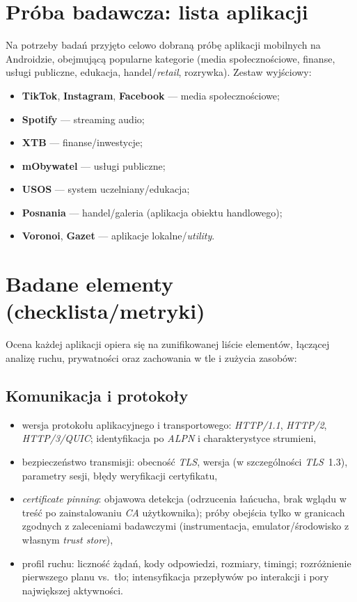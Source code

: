\section{Próba badawcza: lista aplikacji}
Na potrzeby badań przyjęto celowo dobraną próbę aplikacji mobilnych na Androidzie, obejmującą popularne kategorie (media społecznościowe, finanse, usługi publiczne, edukacja, handel/\emph{retail}, rozrywka). Zestaw wyjściowy:
\begin{itemize}
  \item \textbf{TikTok}, \textbf{Instagram}, \textbf{Facebook} — media społecznościowe;
  \item \textbf{Spotify} — streaming audio;
  \item \textbf{XTB} — finanse/inwestycje;
  \item \textbf{mObywatel} — usługi publiczne;
  \item \textbf{USOS} — system uczelniany/edukacja;
  \item \textbf{Posnania} — handel/galeria (aplikacja obiektu handlowego);
  \item \textbf{Voronoi}, \textbf{Gazet} — aplikacje lokalne/\emph{utility}.
\end{itemize}

\section{Badane elementy (checklista/metryki)}
Ocena każdej aplikacji opiera się na zunifikowanej liście elementów, łączącej analizę ruchu, prywatności oraz zachowania w tle i zużycia zasobów:
\subsection{Komunikacja i protokoły}
\begin{itemize}
  \item wersja protokołu aplikacyjnego i transportowego: \emph{HTTP/1.1}, \emph{HTTP/2}, \emph{HTTP/3/QUIC}; identyfikacja po \emph{ALPN} i charakterystyce strumieni,
  \item bezpieczeństwo transmisji: obecność \emph{TLS}, wersja (w szczególności \emph{TLS}~1.3), parametry sesji, błędy weryfikacji certyfikatu,
  \item \emph{certificate pinning}: objawowa detekcja (odrzucenia łańcucha, brak wglądu w treść po zainstalowaniu \emph{CA} użytkownika); próby obejścia tylko w granicach zgodnych z zaleceniami badawczymi (instrumentacja, emulator/środowisko z własnym \emph{trust store}),
  \item profil ruchu: liczność żądań, kody odpowiedzi, rozmiary, timingi; rozróżnienie pierwszego planu vs.\ tło; intensyfikacja przepływów po interakcji i pory największej aktywności.
\end{itemize}

